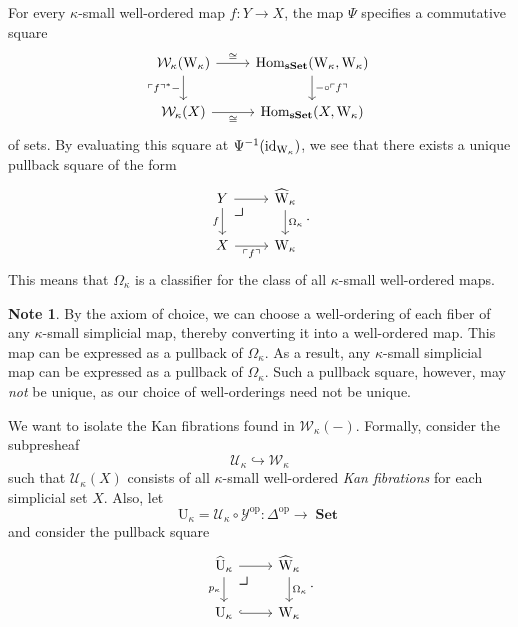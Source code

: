 \documentclass[10pt,letterpaper,cm]{nupset}
\theoremstyle{definition}
\newtheorem{note}[definition]{Note}
\theoremstyle{theorem}
\theoremstyle{remark}
\newcommand{\0}{\mathbf{0}}
\newcommand{\1}{\mathbf{1}}
\newcommand{\2}{\mathbf{2}}
\DeclareMathOperator{\op}{op}
\DeclareMathOperator{\sset}{\mathbf{sSet}}
\DeclareMathOperator{\set}{\mathbf{Set}}
\DeclareMathOperator{\Hom}{Hom}
\DeclareMathOperator{\idd}{id}
\begin{document}
For every $\kappa$-small well-ordered map $f: Y \to X$,  the map $\Psi$ specifies a commutative square
\[
\begin{tikzcd}
\mathcal{W}_{\kappa}(\mathrm{W}_{\kappa}) \arrow[d, "\ulcorner{f}\urcorner^{\ast}{-}"'] \arrow[r, "\cong"] & {\Hom_{\sset}\mleft(\mathrm{W}_{\kappa}, \mathrm{W}_{\kappa}\mright)} \arrow[d, "{-}\circ \ulcorner{f}\urcorner"] \\
\mathcal{W}_{\kappa}(X) \arrow[r, "\cong"']                                                                & {\Hom_{\sset}\mleft(X, \mathrm{W}_{\kappa}\mright)}                                                              
\end{tikzcd}
\] of sets. By evaluating this square at $\Psi^{-1}\mleft(\idd_{\mathrm{W}_{\kappa}}\mright)$, we see  that there exists a unique pullback square of the form
\[
\begin{tikzcd}
Y \arrow[d, "f"'] \arrow[r]    \arrow[dr, phantom, "\scalebox{1.5}{\color{black}$\lrcorner$}" , very near start, color=black]
       & \widehat{\mathrm{W}}_{\kappa} \arrow[d, "\Omega_{\kappa}"] \\
X \arrow[r, "\ulcorner{f}\urcorner"'] & \mathrm{W}_{\kappa}                                       
\end{tikzcd}.
\] This means that $\Omega_{\kappa}$ is a classifier for the class of all $\kappa$-small well-ordered maps.

\begin{note}\label{weakuniv}
By the axiom of choice, we can choose a well-ordering of  each fiber of any $\kappa$-small simplicial map, thereby converting it into a well-ordered map. This map can be expressed as a pullback of $\Omega_{\kappa}$. As a result, any $\kappa$-small simplicial map can be expressed as a pullback of $\Omega_{\kappa}$. Such a pullback square, however, may \emph{not} be unique, as  our choice of well-orderings need not be unique.
\end{note}

\medskip

We want to isolate the Kan fibrations found in $\mathcal{W}_{\kappa}({-})$. Formally, consider the subpresheaf $$\mathcal{U}_{\kappa} \hookrightarrow \mathcal{W}_{\kappa}$$ such that $\mathcal{U}_{\kappa}(X)$ consists of all $\kappa$-small well-ordered \emph{Kan fibrations} for each simplicial set $X$. Also, let
\[
\mathrm{U}_{\kappa} = \mathcal{U}_{\kappa}\circ \mathcal{Y}^{\op} : \varDelta^{\op} \to \set
\]
and consider the pullback square
\[
\begin{tikzcd}
\widehat{\mathrm{U}}_{\kappa} \arrow[r]  \arrow[dr, phantom, "\scalebox{1.5}{\color{black}$\lrcorner$}" , very near start, color=black]
\arrow[d, "p_{\kappa}"'] & \widehat{\mathrm{W}}_{\kappa} \arrow[d, "\Omega_{\kappa}"] \\
\mathrm{U}_{\kappa} \arrow[r, hook]                              & \mathrm{W}_{\kappa}                                       
\end{tikzcd}.
\]
\end{document}

